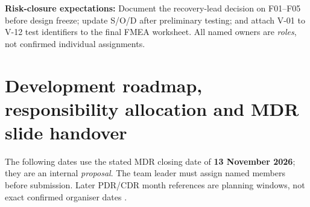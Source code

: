 \textbf{Risk-closure expectations:} Document the recovery-lead decision on F01--F05 before design freeze; update S/O/D after preliminary testing; and attach V-01 to V-12 test identifiers to the final FMEA worksheet. All named owners are \emph{roles}, not confirmed individual assignments.

\section{Development roadmap, responsibility allocation and MDR slide handover}
\label{sec:schedule}
The following dates use the stated MDR closing date of \textbf{13 November 2026}; they are an internal \emph{proposal}. The team leader must assign named members before submission. Later PDR/CDR month references are planning windows, not exact confirmed organiser dates \cite{rtc2027app01,rtc2027app07}.

